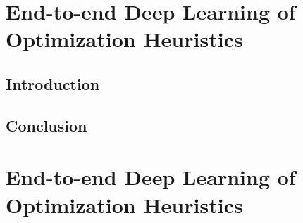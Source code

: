 \ifstapled
\chapter{End-to-end Deep Learning of Optimization Heuristics}
\section{Introduction}
\lipsum[1-2]

\section{Conclusion}
\lipsum[1-2]
\else
\chapter{End-to-end Deep Learning of Optimization Heuristics}





\fi
